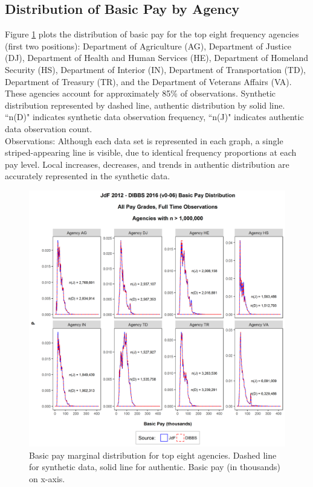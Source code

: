 \documentclass[10pt, letterpaper]{article}
\begin{document}
\begin{spacing}{1.0}
\subsection{Distribution of Basic Pay by Agency}

Figure \ref{figure:JdFDIBBSBasicPayDistribution} plots the distribution of basic pay for the top eight frequency agencies (first two positions):  Department of Agriculture (AG), Department of Justice (DJ), Department of Health and Human Services (HE), Department of Homeland Security (HS), Department of Interior (IN), Department of Transportation (TD), Department of Treasury (TR), and the Department of Veterans Affairs (VA).  These agencies account for approximately 85\% of observations.  Synthetic distribution represented by dashed line, authentic distribution by solid line.  ``n(D)" indicates synthetic data observation frequency, ``n(J)" indicates authentic data observation count.\\

Observations:  Although each data set is represented in each graph, a single striped-appearing line is visible, due to identical frequency proportions at each pay level.  Local increases, decreases, and trends in authentic distribution are accurately represented in the synthetic data.\\

\begin{figure}[h]
    \centering
    \includegraphics[width=6in, trim={0 0.8in 0 1.2in}, clip]{JdFDIBBSBasicPayDistribution.png}
    \caption{Basic pay marginal distribution for top eight agencies.  Dashed line for synthetic data, solid line for authentic.  Basic pay  (in thousands) on x-axis.}
    \label{figure:JdFDIBBSBasicPayDistribution}
\end{figure}


\end{spacing}
\end{document}
